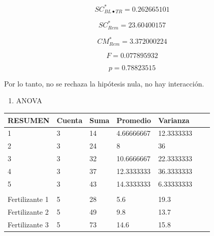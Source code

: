 \documentclass[]{book}
\providecommand{\tightlist}{%
  \setlength{\itemsep}{0pt}\setlength{\parskip}{0pt}}
\theoremstyle{definition}
\theoremstyle{definition}
\theoremstyle{definition}
\theoremstyle{remark}
\begin{document}
\[
SC_{BL \bullet TR}^{*} = 0.262665101
\]

\[
SC_{Rem}^{*} = 23.60400157
\]

\[
CM_{Rem}^{*} = 3.372000224
\]

\[
F = 0.077895932
\]

\[
p = 0.78823515
\]

Por lo tanto, no se rechaza la hipótesis nula, no hay interacción.

\begin{enumerate}
\def\labelenumi{\arabic{enumi}.}
\tightlist
\item
  ANOVA
\end{enumerate}

\begin{longtable}[]{@{}lllllll@{}}
\toprule
RESUMEN & Cuenta & Suma & Promedio & Varianza & &\tabularnewline
\midrule
\endhead
1 & 3 & 14 & 4.66666667 & 12.3333333 & &\tabularnewline
2 & 3 & 24 & 8 & 36 & &\tabularnewline
3 & 3 & 32 & 10.6666667 & 22.3333333 & &\tabularnewline
4 & 3 & 37 & 12.3333333 & 36.3333333 & &\tabularnewline
5 & 3 & 43 & 14.3333333 & 6.33333333 & &\tabularnewline
& & & & & &\tabularnewline
Fertilizante 1 & 5 & 28 & 5.6 & 19.3 & &\tabularnewline
Fertilizante 2 & 5 & 49 & 9.8 & 13.7 & &\tabularnewline
Fertilizante 3 & 5 & 73 & 14.6 & 15.8 & &\tabularnewline
\bottomrule
\end{longtable}
\end{document}
